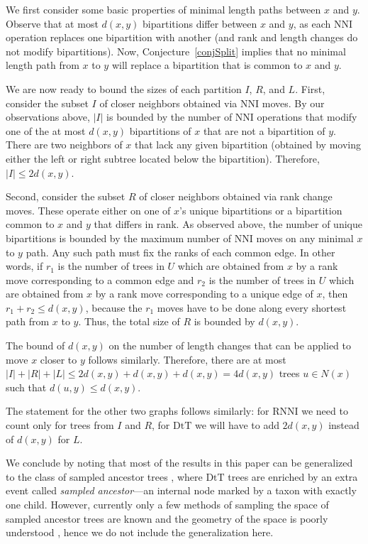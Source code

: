 \documentclass[11pt]{amsart}
\theoremstyle{definition}
\newcommand{\nni}{\mathrm{NNI}}
\newcommand{\rnni}{\mathrm{RNNI}}
\newcommand{\dtt}{\mathrm{DtT}}
\begin{document}
We first consider some basic properties of minimal length paths between $x$ and $y$.
Observe that at most $d(x,y)$ bipartitions differ between $x$ and $y$, as each $\nni$ operation replaces one bipartition with another (and rank and length changes do not modify bipartitions).
Now, Conjecture~\ref{conjSplit} implies that no minimal length path from $x$ to $y$ will replace a bipartition that is common to $x$ and $y$.

We are now ready to bound the sizes of each partition $I$, $R$, and $L$.
First, consider the subset $I$ of closer neighbors obtained via $\nni$ moves.
By our observations above, $|I|$ is bounded by the number of $\nni$ operations that modify one of the at most $d(x,y)$ bipartitions of $x$ that are not a bipartition of $y$.
There are two neighbors of $x$ that lack any given bipartition (obtained by moving either the left or right subtree located below the bipartition).
Therefore, $|I| \le 2d(x,y)$.

Second, consider the subset $R$ of closer neighbors obtained via rank change moves.
These operate either on one of $x$'s unique bipartitions or a bipartition common to $x$ and $y$ that differs in rank.
As observed above, the number of unique bipartitions is bounded by the maximum number of $\nni$ moves on any minimal $x$ to $y$ path.
Any such path must fix the ranks of each common edge.
In other words, if $r_1$ is the number of trees in $U$ which are obtained from $x$ by a rank move corresponding to a common edge and $r_2$ is the number of trees in $U$ which are obtained from $x$ by a rank move corresponding to a unique edge of $x$, then $r_1 + r_2 \leq d(x,y)$, because the $r_1$ moves have to be done along every shortest path from $x$ to $y$.
Thus, the total size of $R$ is bounded by $d(x,y)$.

The bound of $d(x,y)$ on the number of length changes that can be applied to move $x$ closer to $y$ follows similarly.
Therefore, there are at most $|I| + |R| + |L| \le 2d(x,y) + d(x,y) + d(x,y) = 4d(x,y)$ trees $u \in N(x)$ such that $d(u, y) \le d(x, y)$.

The statement for the other two graphs follows similarly: for $\rnni$ we need to count only for trees from $I$ and $R$, for $\dtt$ we will have to add $2d(x,y)$ instead of $d(x,y)$ for $L$.
\endproof

We conclude by noting that most of the results in this paper can be generalized to the class of sampled ancestor trees \autocite{Gavryushkina2014-xd}, where $\dtt$ trees are enriched by an extra event called \emph{sampled ancestor}---an internal node marked by a taxon with exactly one child.
However, currently only a few methods of sampling the space of sampled ancestor trees are known \autocite{Gavryushkina2015-vq} and the geometry of the space is poorly understood \autocite{Gavryushkin2014-bw}, hence we do not include the generalization here.
\end{document}
